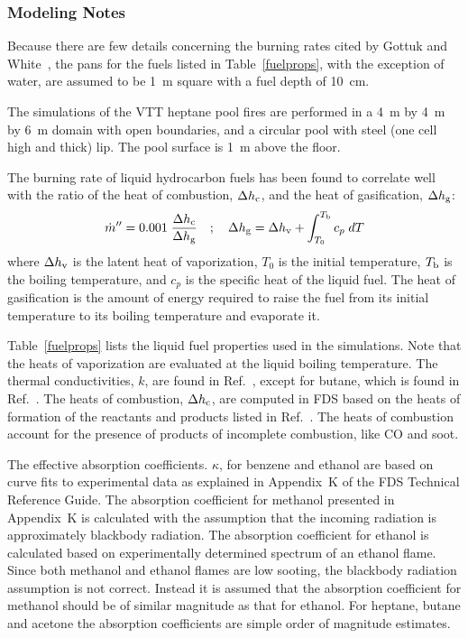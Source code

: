 \subsubsection{Modeling Notes}

Because there are few details concerning the burning rates cited by Gottuk and White~\cite{SFPE:Gottuk_and_White}, the pans for the fuels listed in Table~\ref{fuelprops}, with the exception of water, are assumed to be 1~m square with a fuel depth of 10~cm.

The simulations of the VTT heptane pool fires are performed in a 4~m by 4~m by 6~m domain with open boundaries, and a circular pool with steel (one cell high and thick) lip. The pool surface is 1~m above the floor.

The burning rate of liquid hydrocarbon fuels has been found to correlate well with the ratio of the heat of combustion, $\Delta h_{\rm c}$, and the heat of gasification, $\Delta h_{\rm g}$:
\begin{equation}
\dot{m}''= 0.001 \; \frac{\Delta h_{\rm c}}{\Delta h_{\rm g}} \quad ; \quad \Delta h_{\rm g} = \Delta h_{\rm v} + \int_{T_0}^{T_{\rm b}} c_p \; dT
\label{poolcorr}
\end{equation}
where $\Delta h_{\rm v}$ is the latent heat of vaporization, $T_0$ is the initial temperature, $T_{\rm b}$ is the boiling temperature, and $c_p$ is the specific heat of the liquid fuel. The heat of gasification is the amount of energy required to raise the fuel from its initial temperature to its boiling temperature and evaporate it. 

Table~\ref{fuelprops} lists the liquid fuel properties used in the simulations. Note that the heats of vaporization are evaluated at the liquid boiling temperature. The thermal conductivities, $k$, are found in Ref.~\cite{CRCHandbook}, except for butane, which is found in Ref.~\cite{Webbook:FluidThermo}. The heats of combustion, $\Delta h_{\rm c}$, are computed in FDS based on the heats of formation of the reactants and products listed in Ref.~\cite{NIST_JANAF}. The heats of combustion account for the presence of products of incomplete combustion, like CO and soot.

The effective absorption coefficients. $\kappa$, for benzene and ethanol are based on curve fits to experimental data as explained in Appendix~K of the FDS Technical Reference Guide. The absorption coefficient for methanol presented in Appendix~K is calculated with the assumption that the incoming radiation is approximately blackbody radiation. The absorption coefficient for ethanol is calculated based on experimentally determined spectrum of an ethanol flame. Since both methanol and ethanol flames are low sooting, the blackbody radiation assumption is not correct. Instead it is assumed that the absorption coefficient for methanol should be of similar magnitude as that for ethanol. For heptane, butane and acetone the absorption coefficients are simple order of magnitude estimates.

